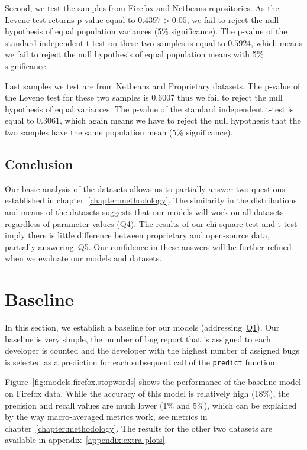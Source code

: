 Second, we test the samples from Firefox and Netbeans repositories. As the Levene test returns p-value equal to $0.4397 > 0.05$, we fail to reject the null hypothesis of equal population variances (5\% significance). The p-value of the standard independent t-test on these two samples is equal to $0.5924$, which means we fail to reject the null hypothesis of equal population means with 5\% significance.

Last samples we test are from Netbeans and Proprietary datasets. The p-value of the Levene test for these two samples is $0.6007$ thus we fail to reject the null hypothesis of equal variances. The p-value of the standard independent t-test is equal to $0.3061$, which again means we have to reject the null hypothesis that the two samples have the same population mean (5\% significance).

\subsection{Conclusion}

Our basic analysis of the datasets allows us to partially answer two questions established in chapter~\ref{chapter:methodology}. The similarity in the distributions and means of the datasets suggests that our models will work on all datasets regardless of parameter values (\hyperlink{question:4}{Q4}). The results of our chi-square test and t-test imply there is little difference between proprietary and open-source data, partially answering~\hyperlink{question:5}{Q5}. Our confidence in these answers will be further refined when we evaluate our models and datasets.

\section{Baseline}
\label{section:baseline}

In this section, we establish a baseline for our models (addressing~\hyperlink{question:1}{Q1}). Our baseline is very simple, the number of bug report that is assigned to each developer is counted and the developer with the highest number of assigned bugs is selected as a prediction for each subsequent call of the \texttt{predict} function.

Figure~\ref{fig:models.firefox.stopwords} shows the performance of the baseline model on Firefox data. While the accuracy of this model is relatively high (18\%), the precision and recall values are much lower (1\% and 5\%), which can be explained by the way macro-averaged metrics work, see metrics in chapter~\ref{chapter:methodology}. The results for the other two datasets are available in appendix~\ref{appendix:extra-plots}.


